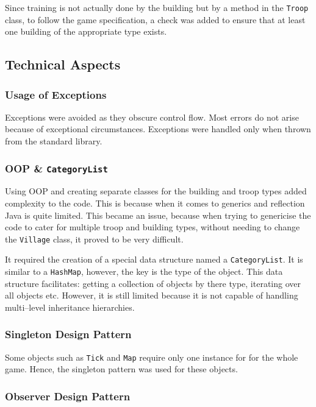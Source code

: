 \documentclass[12pt]{article}
\begin{document}
Since training is not actually done by the building but by a
method in the \texttt{Troop} class, to follow the game
specification, a check was added to ensure that at least one
building of the appropriate type exists. 

\subsection{Technical Aspects}

\subsubsection{Usage of Exceptions}

Exceptions were avoided as they obscure control flow. Most
errors do not arise because of exceptional circumstances.
Exceptions were handled only when thrown from the standard
library.

\subsubsection{OOP \& \texttt{CategoryList}}

Using OOP and creating separate classes for the building and
troop types added complexity to the code. This is because when
it comes to generics and reflection Java is quite limited. This
became an issue, because when trying to genericise the code to
cater for multiple troop and building types, without needing to
change the \texttt{Village} class, it proved to be very difficult.

It required the creation of a special data structure named a
\texttt{CategoryList}. It is similar to a \texttt{HashMap},
however, the key is the type of the object. This data structure
facilitates: getting a collection of objects by there type,
iterating over all objects etc. However, it is still limited
because it is not capable of handling multi--level inheritance
hierarchies.

\subsubsection{Singleton Design Pattern}

Some objects such as \texttt{Tick} and \texttt{Map} require only
one instance for for the whole game. Hence, the singleton
pattern was used for these objects.

\subsubsection{Observer Design Pattern}
\end{document}
